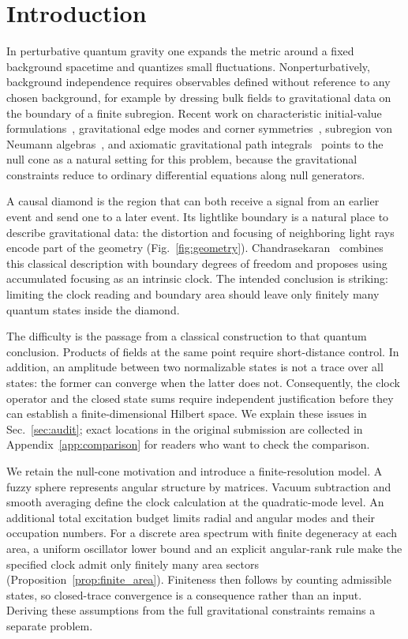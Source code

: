 \documentclass[onecolumn,11pt,aps,prd,amsmath,amssymb,nofootinbib,floatfix]{revtex4-2}
\begin{document}
\section{Introduction}\label{sec:intro}

In perturbative quantum gravity one expands the metric around a fixed background spacetime and quantizes small fluctuations. Nonperturbatively, background independence requires observables defined without reference to any chosen background, for example by dressing bulk fields to gravitational data on the boundary of a finite subregion. Recent work on characteristic initial-value formulations~\cite{ChoquetBruhat2011,Reisenberger2008,Reisenberger2013}, gravitational edge modes and corner symmetries~\cite{DonnellyFreidel2016,FreidelGeillerPranzetti2020,ChandrasekaranFlanagan2023,CiambelliFreidelLeigh2024,CiambelliKlinger2026}, subregion von Neumann algebras~\cite{CLPW2023,CPW2023}, and axiomatic gravitational path integrals~\cite{CDMW2024} points to the null cone as a natural setting for this problem, because the gravitational constraints reduce to ordinary differential equations along null generators.

A causal diamond is the region that can both receive a signal from an earlier event and send one to a later event. Its lightlike boundary is a natural place to describe gravitational data: the distortion and focusing of neighboring light rays encode part of the geometry (Fig.~\ref{fig:geometry}). Chandrasekaran~\cite{Chandrasekaran2026} combines this classical description with boundary degrees of freedom and proposes using accumulated focusing as an intrinsic clock. The intended conclusion is striking: limiting the clock reading and boundary area should leave only finitely many quantum states inside the diamond.

The difficulty is the passage from a classical construction to that quantum conclusion. Products of fields at the same point require short-distance control. In addition, an amplitude between two normalizable states is not a trace over all states: the former can converge when the latter does not. Consequently, the clock operator and the closed state sums require independent justification before they can establish a finite-dimensional Hilbert space. We explain these issues in Sec.~\ref{sec:audit}; exact locations in the original submission are collected in Appendix~\ref{app:comparison} for readers who want to check the comparison.

We retain the null-cone motivation and introduce a finite-resolution model. A fuzzy sphere represents angular structure by matrices. Vacuum subtraction and smooth averaging define the clock calculation at the quadratic-mode level. An additional total excitation budget limits radial and angular modes and their occupation numbers. For a discrete area spectrum with finite degeneracy at each area, a uniform oscillator lower bound and an explicit angular-rank rule make the specified clock admit only finitely many area sectors (Proposition~\ref{prop:finite_area}). Finiteness then follows by counting admissible states, so closed-trace convergence is a consequence rather than an input. Deriving these assumptions from the full gravitational constraints remains a separate problem.
\end{document}
